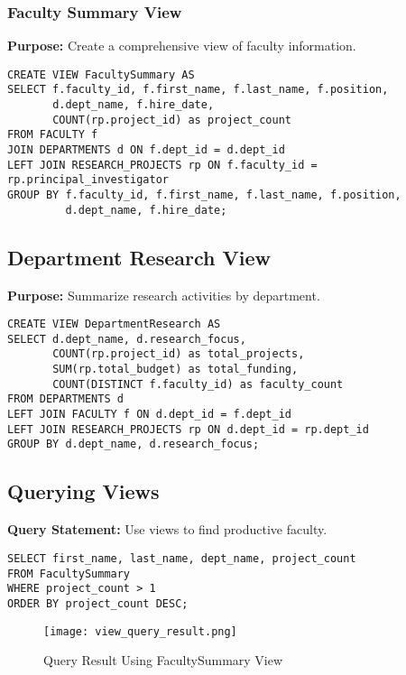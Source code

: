 \documentclass[12pt,a4paper]{article}
\begin{document}
\subsubsection{Faculty Summary View}
\textbf{Purpose:} Create a comprehensive view of faculty information.

\begin{lstlisting}[style=sqlstyle]
CREATE VIEW FacultySummary AS
SELECT f.faculty_id, f.first_name, f.last_name, f.position,
       d.dept_name, f.hire_date,
       COUNT(rp.project_id) as project_count
FROM FACULTY f
JOIN DEPARTMENTS d ON f.dept_id = d.dept_id
LEFT JOIN RESEARCH_PROJECTS rp ON f.faculty_id = rp.principal_investigator
GROUP BY f.faculty_id, f.first_name, f.last_name, f.position, 
         d.dept_name, f.hire_date;
\end{lstlisting}

\subsection{Department Research View}
\textbf{Purpose:} Summarize research activities by department.

\begin{lstlisting}[style=sqlstyle]
CREATE VIEW DepartmentResearch AS
SELECT d.dept_name, d.research_focus,
       COUNT(rp.project_id) as total_projects,
       SUM(rp.total_budget) as total_funding,
       COUNT(DISTINCT f.faculty_id) as faculty_count
FROM DEPARTMENTS d
LEFT JOIN FACULTY f ON d.dept_id = f.dept_id
LEFT JOIN RESEARCH_PROJECTS rp ON d.dept_id = rp.dept_id
GROUP BY d.dept_name, d.research_focus;
\end{lstlisting}

\subsection{Querying Views}

\textbf{Query Statement:} Use views to find productive faculty.

\begin{lstlisting}[style=sqlstyle]
SELECT first_name, last_name, dept_name, project_count
FROM FacultySummary
WHERE project_count > 1
ORDER BY project_count DESC;
\end{lstlisting}

\begin{figure}[H]
    \centering
    \texttt{[image: view\_query\_result.png]}
    \caption{Query Result Using FacultySummary View}
\end{figure}
\end{document}
